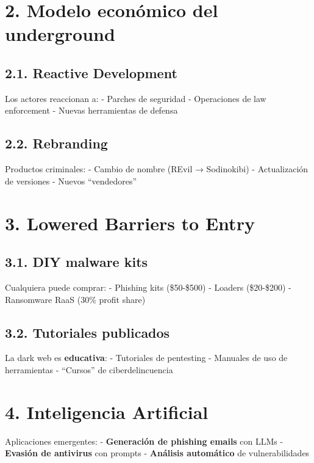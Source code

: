 \documentclass[
  letterpaper,
]{report}
\begin{document}
\section{2. Modelo económico del
underground}\label{modelo-econuxf3mico-del-underground}

\subsection{2.1. Reactive Development}\label{reactive-development}

Los actores reaccionan a: - Parches de seguridad - Operaciones de law
enforcement - Nuevas herramientas de defensa

\subsection{2.2. Rebranding}\label{rebranding}

Productos criminales: - Cambio de nombre (REvil → Sodinokibi) -
Actualización de versiones - Nuevos ``vendedores''

\section{3. Lowered Barriers to Entry}\label{lowered-barriers-to-entry}

\subsection{3.1. DIY malware kits}\label{diy-malware-kits}

Cualquiera puede comprar: - Phishing kits (\$50-\$500) - Loaders
(\$20-\$200) - Ransomware RaaS (30\% profit share)

\subsection{3.2. Tutoriales publicados}\label{tutoriales-publicados}

La dark web es \textbf{educativa}: - Tutoriales de pentesting - Manuales
de uso de herramientas - ``Cursos'' de ciberdelincuencia

\section{4. Inteligencia Artificial}\label{inteligencia-artificial}

Aplicaciones emergentes: - \textbf{Generación de phishing emails} con
LLMs - \textbf{Evasión de antivirus} con prompts - \textbf{Análisis
automático} de vulnerabilidades
\end{document}
